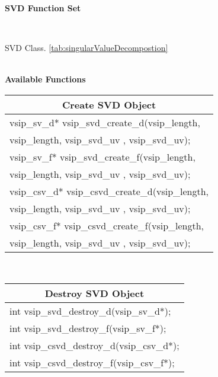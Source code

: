 \clearpage
\hypertarget{svdFunc}{\large \textbf{SVD Function Set}}\vspace{.2cm}\\
\hspace*{.3cm}
\parbox{0.85\textwidth}{SVD Class. \ref{tab:singularValueDecompostion}}
\\\cvsiplh 
\newline \hspace*{.8cm} \vspace*{.1cm} \textbf{Available Functions }
%
\newline \hspace*{1.cm} {
\ttfamily\vspace{.3cm}
\begin{tabular}[H]{|l|}
\multicolumn{1}{c}{\rmfamily \bfseries Create SVD Object\vspace{.1cm}}\\ \hline
vsip\_sv\_d* vsip\_svd\_create\_d(vsip\_length,\\*\hspace*{.8cm}vsip\_length, vsip\_svd\_uv , vsip\_svd\_uv);\\
vsip\_sv\_f* vsip\_svd\_create\_f(vsip\_length,\\*\hspace*{.8cm}vsip\_length, vsip\_svd\_uv , vsip\_svd\_uv);\\
vsip\_csv\_d* vsip\_csvd\_create\_d(vsip\_length,\\*\hspace*{.8cm}vsip\_length, vsip\_svd\_uv , vsip\_svd\_uv);\\
vsip\_csv\_f* vsip\_csvd\_create\_f(vsip\_length,\\*\hspace*{.8cm}vsip\_length, vsip\_svd\_uv , vsip\_svd\_uv);\\
\hline\end{tabular}\\}
%
\newline \hspace*{1.cm} {
\ttfamily\vspace{.3cm}
\begin{tabular}[H]{|l|}
\multicolumn{1}{c}{\rmfamily \bfseries Destroy SVD Object\vspace{.1cm}}\\ \hline
int vsip\_svd\_destroy\_d(vsip\_sv\_d*);\\
int vsip\_svd\_destroy\_f(vsip\_sv\_f*);\\
int vsip\_csvd\_destroy\_d(vsip\_csv\_d*);\\
int vsip\_csvd\_destroy\_f(vsip\_csv\_f*);\\
\hline\end{tabular}\\}
